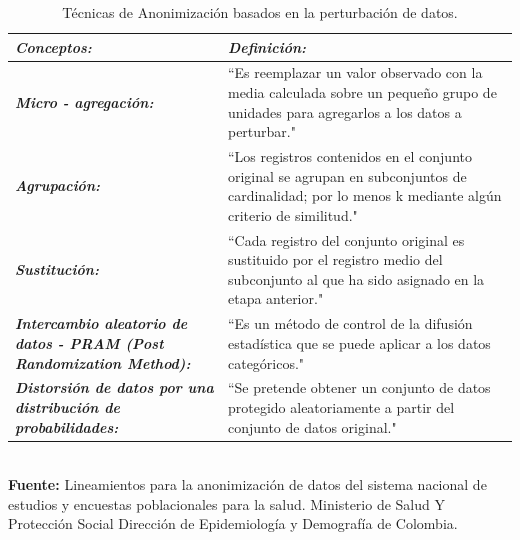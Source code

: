 \documentclass[a4paper,openright,12pt]{book}
\theoremstyle{definition}
\theoremstyle{remark}
\begin{document}
\begin{table}[ht]
\centering
\caption{Técnicas de Anonimización basados en la perturbación de datos.}
\begin{tabular}{>{\centering\arraybackslash}m{3cm} >{\arraybackslash}m{10cm} }
\hline
\textbf{\textit{Conceptos:}} & \textbf{\textit{Definición:}} \\ \hline
\textbf{\textit{Micro - agregación:}} & “Es reemplazar un valor observado con la media calculada sobre un pequeño grupo de unidades para agregarlos a los datos a perturbar." \\ \hline
\textbf{\textit{Agrupación:}} & “Los registros contenidos en el conjunto original se agrupan en subconjuntos de cardinalidad; por lo menos k mediante algún criterio de similitud."\\ \hline
\textbf{\textit{Sustitución:}} & “Cada registro del conjunto original es sustituido por el registro medio del subconjunto al que ha sido asignado en la etapa anterior." \\ \hline
\textbf{\textit{Intercambio aleatorio de datos - PRAM (Post Randomization Method):}} & “Es un método de control de la difusión estadística que se puede aplicar a los datos categóricos." \\ \hline
\textbf{\textit{Distorsión de datos por una distribución de probabilidades:}} & “Se pretende obtener un conjunto de datos protegido aleatoriamente a partir del conjunto de datos original." \\ \hline
\end{tabular}
\label{tabla:RobustezPropiedades}
\\\textbf{Fuente:} Lineamientos para la anonimización de datos del sistema nacional de estudios y encuestas poblacionales para la salud. Ministerio de Salud Y Protección Social Dirección de Epidemiología y Demografía de Colombia.
\end{table}
\end{document}
